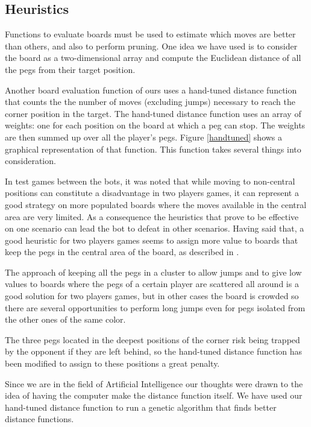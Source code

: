 


\subsection{Heuristics}

Functions to evaluate boards must be used to estimate which moves are
better than others, and also to perform pruning. One idea we have used
is to consider the board as a two-dimensional array and compute the
Euclidean distance of all the pegs from their target position.

Another board evaluation function of ours uses a hand-tuned distance
function that counts the the number of moves (excluding jumps)
necessary to reach the corner position in the target. The hand-tuned
distance function uses an array of weights: one for each position on
the board at which a peg can stop. The weights are then summed up over
all the player's pegs. Figure \ref{handtuned} shows a graphical
representation of that function. This function takes several things
into consideration.

In test games between the bots, it was noted that while moving to
non-central positions can constitute a disadvantage in two players games, it can
represent a good strategy on more populated boards where the moves available in
the central area are very limited. As a consequence the heuristics that prove to
be effective on one scenario can lead the bot to defeat in other scenarios.
Having said that, a good heuristic for two players games seems to assign more
value to boards that keep the pegs in the central area of the board, as
described in \cite{ulfhake}.

The approach of keeping all the pegs in a cluster to allow jumps and to give low
values to boards where the pegs of a certain player are scattered all around is
a good solution for two players games, but in other cases the board is crowded
so there are several opportunities to perform long jumps even for pegs isolated
from the other ones of the same color.

The three pegs located in the deepest positions of the corner risk being trapped
by the opponent if they are left behind, so the hand-tuned distance function has
been modified to assign to these positions a great penalty.

Since we are in the field of Artificial Intelligence our thoughts
were drawn to the idea of having the computer make the distance
function itself. We have used our hand-tuned distance function to run
a genetic algorithm that finds better distance functions.


